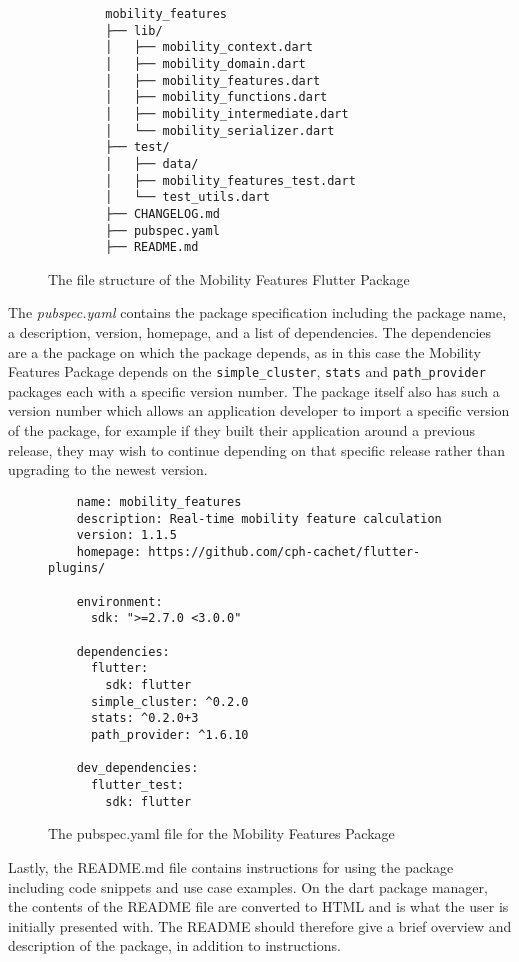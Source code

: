 \begin{figure}
    \centering
    \begin{verbatim}
        mobility_features
        ├── lib/
        │   ├── mobility_context.dart
        │   ├── mobility_domain.dart
        │   ├── mobility_features.dart
        │   ├── mobility_functions.dart
        │   ├── mobility_intermediate.dart
        │   └── mobility_serializer.dart
        ├── test/
        │   ├── data/
        │   ├── mobility_features_test.dart
        │   └── test_utils.dart
        ├── CHANGELOG.md
        ├── pubspec.yaml
        ├── README.md
    \end{verbatim}
    \caption{The file structure of the Mobility Features Flutter Package}
    \label{fig:package-structure}
\end{figure}

The \textit{pubspec.yaml} contains the package specification including the package name, a description, version, homepage, and a list of dependencies. The dependencies are a the package on which the package depends, as in this case the Mobility Features Package depends on the \verb|simple_cluster|, \verb|stats| and \verb|path_provider| packages each with a specific version number. The package itself also has such a version number which allows an application developer to import a specific version of the package, for example if they built their application around a previous release, they may wish to continue depending on that specific release rather than upgrading to the newest version.

\begin{figure}
    \centering
    \begin{verbatim}
    name: mobility_features
    description: Real-time mobility feature calculation
    version: 1.1.5
    homepage: https://github.com/cph-cachet/flutter-plugins/
    
    environment:
      sdk: ">=2.7.0 <3.0.0"
    
    dependencies:
      flutter:
        sdk: flutter
      simple_cluster: ^0.2.0
      stats: ^0.2.0+3
      path_provider: ^1.6.10
    
    dev_dependencies:
      flutter_test:
        sdk: flutter
    \end{verbatim}
    \caption{The pubspec.yaml file for the Mobility Features Package}
    \label{fig:pubspec}
\end{figure}

Lastly, the README.md file contains instructions for using the package including code snippets and use case examples. On the dart package manager, the contents of the README file are converted to HTML and is what the user is initially presented with. The README should therefore give a brief overview and description of the package, in addition to instructions.

